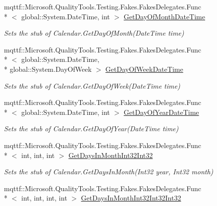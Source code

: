 \begin{DoxyCompactItemize}
mqttf\-::\-Microsoft.\-Quality\-Tools.\-Testing.\-Fakes.\-Fakes\-Delegates.\-Func\\*
$<$ global\-::\-System.\-Date\-Time, int $>$ \hyperlink{class_system_1_1_globalization_1_1_fakes_1_1_stub_calendar_ac247943d9e1b891c2d7de2b96f21b39b}{Get\-Day\-Of\-Month\-Date\-Time}
\begin{DoxyCompactList}\small\item\em Sets the stub of Calendar.\-Get\-Day\-Of\-Month(\-Date\-Time time)\end{DoxyCompactList}\item 
mqttf\-::\-Microsoft.\-Quality\-Tools.\-Testing.\-Fakes.\-Fakes\-Delegates.\-Func\\*
$<$ global\-::\-System.\-Date\-Time, \\*
global\-::\-System.\-Day\-Of\-Week $>$ \hyperlink{class_system_1_1_globalization_1_1_fakes_1_1_stub_calendar_a586a4f1d69ae679c566cecafaedd4fe7}{Get\-Day\-Of\-Week\-Date\-Time}
\begin{DoxyCompactList}\small\item\em Sets the stub of Calendar.\-Get\-Day\-Of\-Week(\-Date\-Time time)\end{DoxyCompactList}\item 
mqttf\-::\-Microsoft.\-Quality\-Tools.\-Testing.\-Fakes.\-Fakes\-Delegates.\-Func\\*
$<$ global\-::\-System.\-Date\-Time, int $>$ \hyperlink{class_system_1_1_globalization_1_1_fakes_1_1_stub_calendar_a02d0ac9509112e868805d9a8b21decbd}{Get\-Day\-Of\-Year\-Date\-Time}
\begin{DoxyCompactList}\small\item\em Sets the stub of Calendar.\-Get\-Day\-Of\-Year(\-Date\-Time time)\end{DoxyCompactList}\item 
mqttf\-::\-Microsoft.\-Quality\-Tools.\-Testing.\-Fakes.\-Fakes\-Delegates.\-Func\\*
$<$ int, int, int $>$ \hyperlink{class_system_1_1_globalization_1_1_fakes_1_1_stub_calendar_ac856660bdc078b6b34fd4c54305a34a8}{Get\-Days\-In\-Month\-Int32\-Int32}
\begin{DoxyCompactList}\small\item\em Sets the stub of Calendar.\-Get\-Days\-In\-Month(\-Int32 year, Int32 month)\end{DoxyCompactList}\item 
mqttf\-::\-Microsoft.\-Quality\-Tools.\-Testing.\-Fakes.\-Fakes\-Delegates.\-Func\\*
$<$ int, int, int, int $>$ \hyperlink{class_system_1_1_globalization_1_1_fakes_1_1_stub_calendar_aa2959a9a10a5ab2f7353e8bb6c5c1acc}{Get\-Days\-In\-Month\-Int32\-Int32\-Int32}

\end{DoxyCompactItemize}
